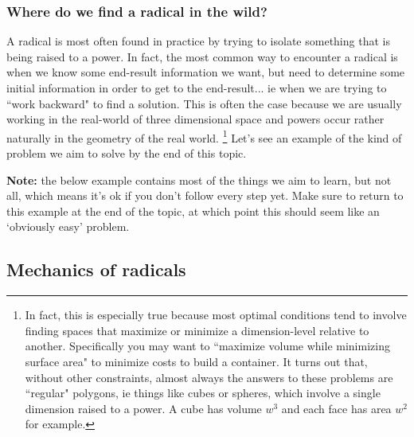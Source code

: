     \subsubsection{Where do we find a radical in the wild?}
        A radical is most often found in practice by trying to isolate something that is being raised to a power. In fact, the most common way to encounter a radical is when we know some end-result information we want, but need to determine some initial information in order to get to the end-result... ie when we are trying to ``work backward" to find a solution. This is often the case because we are usually working in the real-world of three dimensional space and powers occur rather naturally in the geometry of the real world.%
        \footnote{In fact, this is especially true because most optimal conditions tend to involve finding spaces that maximize or minimize a dimension-level relative to another. Specifically you may want to ``maximize volume while minimizing surface area" to minimize costs to build a container. It turns out that, without other constraints, almost always the answers to these problems are ``regular" polygons, ie things like cubes or spheres, which involve a single dimension raised to a power. A cube has volume $w^3$ and each face has area $w^2$ for example.}
        Let's see an example of the kind of problem we aim to solve by the end of this topic.

        \textbf{Note:} the below example contains most of the things we aim to learn, but not all, which means it's ok if you don't follow every step yet. Make sure to return to this example at the end of the topic, at which point this should seem like an `obviously easy' problem.


\subsection{Mechanics of radicals}

